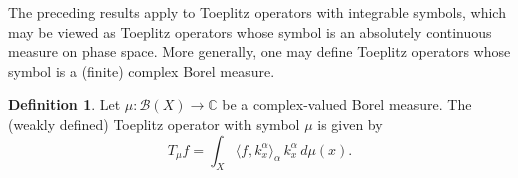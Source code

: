 \documentclass{amsart}
\theoremstyle{definition}
\newtheorem{definition}[thm]{Definition}
\theoremstyle{remark}
\numberwithin{equation}{section}
\newcommand{\ip}[2]{\left\langle {#1} , {#2} \right\rangle} %
\newcommand{\C}{\mathbb{C}} %
\begin{document}

The preceding results apply to Toeplitz operators with integrable symbols, which may be viewed as Toeplitz operators whose symbol is an absolutely continuous measure on phase space. More generally, one may define Toeplitz operators whose symbol is a (finite) complex Borel measure.

\begin{definition}
Let $\mu:\mathcal{B}(X)\to\C$ be a complex-valued Borel measure. The (weakly defined) Toeplitz operator with symbol $\mu$ is given by
\[
T_\mu f
= \int_X \langle f,k_x^\alpha\rangle_\alpha \, k_x^\alpha \, d\mu(x).
\]
\end{definition}
\end{document}
